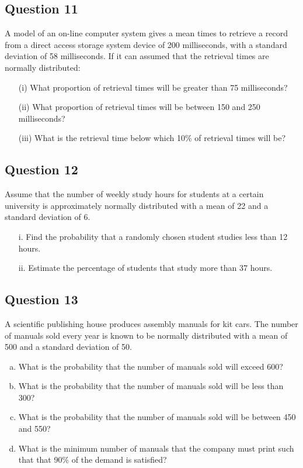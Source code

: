 \documentclass[]{report}
\begin{document}
\begin{enumerate}[(a)]
\begin{enumerate}[(a)]

\subsection*{Question 11}

A model of an on-line computer system gives a mean times to retrieve a record from a direct access storage system device of 200 milliseconds, with a standard deviation of 58 milliseconds. If it can assumed that the retrieval times are normally distributed:

\begin{itemize}
	\item[(i)] What proportion of retrieval times will be greater than 75 milliseconds?
	\item[(ii)] What proportion of retrieval times will be between 150 and 250 milliseconds?
	\item[(iii)] What is the retrieval time below which 10\% of retrieval times will be?
\end{itemize}


	
\subsection*{Question 12}
Assume that the number of weekly study hours for students at a certain university is approximately normally distributed with a mean of 22 and a standard deviation of 6.

\begin{itemize}
	\item[i.] Find the probability that a randomly chosen student studies less than 12 hours.
	\item[ii.] Estimate the percentage of students that study more than 37 hours.
\end{itemize}


\subsection*{Question 13}

A scientific publishing house produces assembly manuals for kit cars. The number
of manuals sold every year is known to be normally distributed with a mean of 500 and a
standard deviation of 50.

\begin{enumerate}[(a)]
	\item What is the probability that the number of manuals sold will exceed 600?
	\item What is the probability that the number of manuals sold will be less than 300?
	\item What is the probability that the number of manuals sold will be between 450 and 550?
	\item What is the minimum number of manuals that the company must print such
	that that 90\% of the demand is satisfied?
\end{enumerate}

\end{enumerate}
\end{enumerate}
\end{document}
